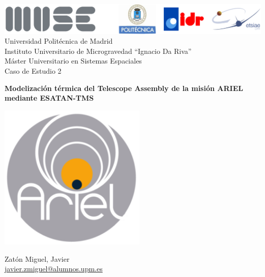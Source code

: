 \documentclass[a4paper,12pt]{article}
\begin{document}
\begin{center}
\thispagestyle{empty}

\includegraphics[width=\textwidth]{Logo_portada.png} \\
\vspace{0.5cm}
{\large
Universidad Politécnica de Madrid \\
Instituto Universitario de Microgravedad “Ignacio Da Riva” \\
Máster Universitario en Sistemas Espaciales}\\ 
\vspace{0.5cm}
{\large Caso de Estudio 2}\\ 
\vspace{1.5cm} %

{\huge \textbf{Modelización térmica del Telescope Assembly de la misión ARIEL mediante ESATAN-TMS}}\\ 
\vspace{0.5cm}

\includegraphics[width= 7cm]{IM/ARIEL-LOGO.png}

\vspace{1cm} %
\begin{center}
        \vspace{0.5cm}
        {\large Zatón Miguel, Javier } \\ \href{mailto:javier.zmiguel@alumnos.upm.es} {javier.zmiguel@alumnos.upm.es} \vspace{1.5cm}

\vspace{0.5cm}
\end{center}
\end{center}
\end{document}
